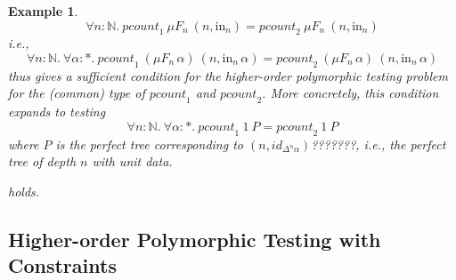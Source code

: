 \documentclass{article}[12 pt]
\newtheorem{example}{Example}
\theoremstyle{problemstyle}
\begin{document}
\begin{example}
\begin{equation}
  \forall n : \mathbb{N}.\ \mathit{pcount}_1~\mu F_n~(n,
  \mathrm{in}_n) = \mathit{pcount}_2~\mu F_n~(n, \mathrm{in}_n)
\end{equation}
\noindent
i.e.,
\begin{equation}
  \forall n : \mathbb{N}.\ \forall \alpha :
  *.\ \mathit{pcount}_1~(\mu F_n \, \alpha)~(n, \mathrm{in}_n
  \,\alpha) = \mathit{pcount}_2~(\mu F_n \, \alpha)~(n, \mathrm{in}_n
  \,\alpha)
\end{equation}
\noindent
thus gives a sufficient condition for the higher-order polymorphic
testing problem for the (common) type of $\mathit{pcount}_1$ and
$\mathit{pcount}_2$.
More concretely, this condition expands to testing
\begin{equation}
  \forall n : \mathbb{N}.\ \forall \alpha :
  *.~\mathit{pcount}_1~1~P =
  \mathit{pcount}_2~1~P
\end{equation}
\noindent
where $P$ is the perfect tree corresponding to
$(n, id_{\Delta^n\alpha})$???????, i.e., the perfect tree of depth $n$
with unit data.

\noindent
holds.
\end{example}


\subsection{Higher-order Polymorphic Testing with Constraints}
\end{document}
